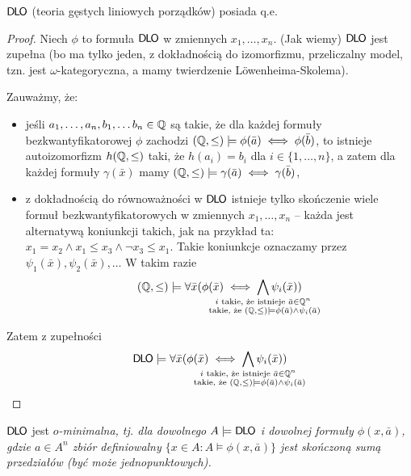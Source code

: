 \documentclass{article}
\begin{document}
\begin{tw}
	$\mathsf{D \mkern-1.5mu L \mkern-1.8mu O}$ (teoria gęstych liniowych porządków) posiada q.e.
\end{tw}
\begin{proof}
	Niech $\phi$ to formuła $\mathsf{D \mkern-1.5mu L \mkern-1.8mu O}$ w zmiennych $x_1, \ldots, x_n$.
	(Jak wiemy) $\mathsf{D \mkern-1.5mu L \mkern-1.8mu O}$ jest zupełna (bo ma tylko jeden, z dokładnością do izomorfizmu, przeliczalny model, tzn. jest $\omega$-kategoryczna, a mamy twierdzenie Löwenheima-Skolema).

	Zauważmy, że:
	\begin{itemize}
		\item jeśli $a_1, \ldots, a_n, b_1, \ldots b_n \in \mathbb{Q}$ są takie, że dla każdej formuły bezkwantyfikatorowej $\phi$ zachodzi $(\mathbb{Q}, \leq) \models \phi(\bar{a}) \iff \phi(\bar{b})$, to istnieje autoizomorfizm $h(\mathbb{Q}, \leq)$ taki, że $h(a_i) = b_i$ dla $i \in \{1, \ldots, n\}$, a zatem dla każdej formuły $\gamma(\bar{x})$ mamy $(\mathbb{Q}, \leq) \models \gamma(\bar{a}) \iff \gamma(\bar{b})$,
		\item z dokładnością do równoważności w $\mathsf{D \mkern-1.5mu L \mkern-1.8mu O}$ istnieje tylko skończenie wiele formuł bezkwantyfikatorowych w zmiennych $x_1, \ldots, x_n$ -- każda jest alternatywą koniunkcji takich, jak na przykład ta: $x_1 = x_2 \wedge x_1 \leq x_3 \wedge \neg x_3 \leq x_1$.
			Takie koniunkcje oznaczamy przez $\psi_1(\bar{x}), \psi_2(\bar{x}), \ldots$
			W takim razie
			\[(\Q, \leq) \models \forall \bar{x} (\phi(\bar{x}) \iff \bigwedge_{\mathclap{\substack{i \text{ takie, że istnieje } \bar{a} \in \Q^n \\ \text{ takie, że }(\Q, \leq) \models \phi(\bar{a}) \wedge \psi_i(\bar{a})}}} \psi_i(\bar{x}))\]
	\end{itemize}
	Zatem z zupełności
			\[\DLO \models \forall \bar{x} (\phi(\bar{x}) \iff \bigwedge_{\mathclap{\substack{i \text{ takie, że istnieje } \bar{a} \in \Q^n \\ \text{ takie, że }(\Q, \leq) \models \phi(\bar{a}) \wedge \psi_i(\bar{a})}}} \psi_i(\bar{x}))\]
\end{proof}

\begin{wn}
	$\mathsf{D \mkern-1.5mu L \mkern-1.8mu O}$ jest \em{$o$-minimalna}, tj. dla dowolnego $A \models \mathsf{D \mkern-1.5mu L \mkern-1.8mu O}$ i dowolnej formuły $\phi(x,\bar{a})$, gdzie $a \in A^n$ zbiór definiowalny $\{x \in A \colon  A \models \phi(x,\bar{a})\}$ jest skończoną sumą przedziałów (być może jednopunktowych).
\end{wn}
\end{document}
